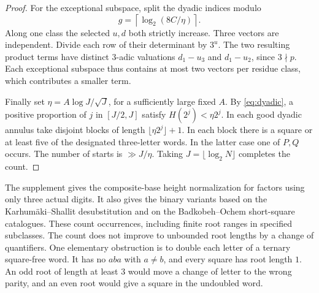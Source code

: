 \begin{proof}
For the exceptional subspace, split the dyadic indices modulo
\[
 g=\left\lceil\log_2(8C/\eta)\right\rceil .
\]
Along one class the selected $u,d$ both strictly increase. Three vectors are independent. Divide each row of their determinant by $3^u$. The two resulting product terms have distinct $3$-adic valuations $d_1-u_3$ and $d_1-u_2$, since $3\nmid p$. Each exceptional subspace thus contains at most two vectors per residue class, which contributes a smaller term.

Finally set $\eta=A\log J/\sqrt J$, for a sufficiently large fixed $A$. By \eqref{eq:dyadic}, a positive proportion of $j$ in $[J/2,J]$ satisfy $H(2^j)<\eta2^j$. In each good dyadic annulus take disjoint blocks of length $\lfloor\eta2^j\rfloor+1$. In each block there is a square or at least five of the designated three-letter words. In the latter case one of $P,Q$ occurs. The number of starts is $\gg J/\eta$. Taking $J=\lfloor\log_2 N\rfloor$ completes the count.
\end{proof}

The supplement gives the composite-base height normalization for factors using only three actual digits. It also gives the binary variants based on the Karhum\"aki--Shallit desubstitution and on the Badkobeh--Ochem short-square catalogues. These count occurrences, including finite root ranges in specified subclasses. The count does not improve to unbounded root lengths by a change of quantifiers. One elementary obstruction is to double each letter of a ternary square-free word. It has no $aba$ with $a\ne b$, and every square has root length $1$. An odd root of length at least $3$ would move a change of letter to the wrong parity, and an even root would give a square in the undoubled word.
